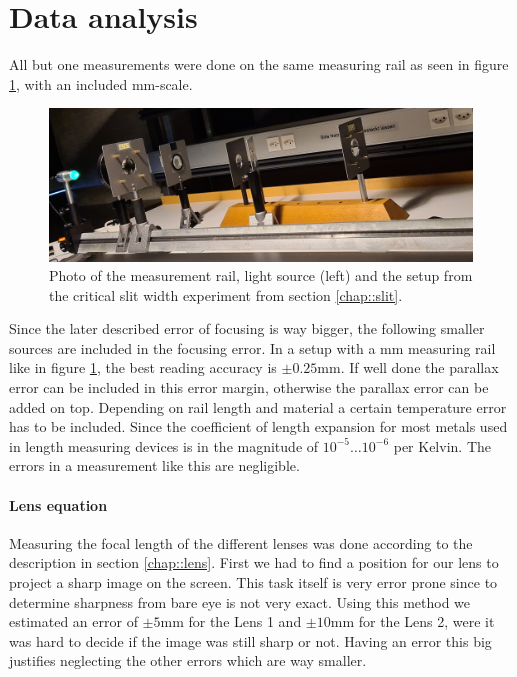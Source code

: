 \section{Data analysis}

All but one measurements were done on the same measuring rail as seen in figure \ref{fig::rail}, with an included \si{\milli \m}-scale. 
\begin{figure}[h!]
	\centering
	\includegraphics[width=\textwidth]{img/railcut.jpeg}
	\caption{Photo of the measurement rail, light source (left) and the setup from the critical slit width experiment from section \ref{chap::slit}.}
	\label{fig::rail}
\end{figure}

Since the later described error of focusing is way bigger, the following smaller sources are included in the focusing error.
In a setup with a \si{\milli \m} measuring rail like in figure \ref{fig::rail}, the best reading accuracy is $\pm 0.25 \si{\milli \m}$. 
If well done the parallax error can be included in this error margin, otherwise the parallax error can be added on top.
Depending on rail length and material a certain temperature error has to be included. 
Since the coefficient of length expansion for most metals used in length measuring devices is in the magnitude of $10^{-5} \dots 10^{-6}$ per Kelvin.
The errors in a measurement like this are negligible. 

\paragraph{Lens equation}
Measuring the focal length of the different lenses was done according to the description in section \ref{chap::lens}. 
First we had to find a position for our lens to project a sharp image on the screen.
This task itself is very error prone since to determine sharpness from bare eye is not very exact.
Using this method we estimated an error of $\pm 5$\si{\milli\m} for the Lens 1 and $\pm 10$\si{\milli\m} for the Lens 2, were it was hard to decide if the image was still sharp or not.
Having an error this big justifies neglecting the other errors which are way smaller.

